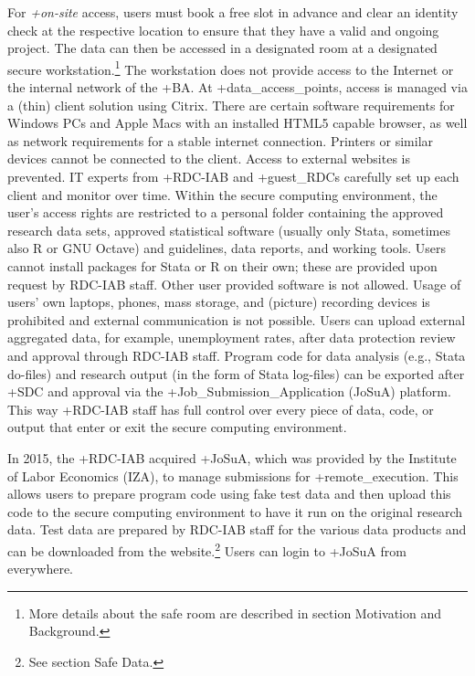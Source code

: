 \documentclass[
]{WileySix}
\begin{document}
For \emph{+on-site\textbar{}} access, users must book a free slot in advance and clear an identity check at the respective location to ensure that they have a valid and ongoing project. The data can then be accessed in a designated room at a designated secure workstation.\footnote{More details about the safe room are described in section Motivation and Background.} The workstation does not provide access to the Internet or the internal network of the +BA\textbar. At +data\_access\_points\textbar, access is managed via a (thin) client solution using Citrix. There are certain software requirements for Windows PCs and Apple Macs with an installed HTML5 capable browser, as well as network requirements for a stable internet connection. Printers or similar devices cannot be connected to the client. Access to external websites is prevented. IT experts from +RDC-IAB\textbar{} and +guest\_RDC\textbar s carefully set up each client and monitor over time. Within the secure computing environment, the user's access rights are restricted to a personal folder containing the approved research data sets, approved statistical software (usually only Stata, sometimes also R or GNU Octave) and guidelines, data reports, and working tools. Users cannot install packages for Stata or R on their own; these are provided upon request by RDC-IAB staff. Other user provided software is not allowed. Usage of users' own laptops, phones, mass storage, and (picture) recording devices is prohibited and external communication is not possible. Users can upload external aggregated data, for example, unemployment rates, after data protection review and approval through RDC-IAB staff. Program code for data analysis (e.g., Stata do-files) and research output (in the form of Stata log-files) can be exported after +SDC\textbar{} and approval via the +Job\_Submission\_Application\textbar{} (JoSuA) platform. This way +RDC-IAB\textbar{} staff has full control over every piece of data, code, or output that enter or exit the secure computing environment.

In 2015, the +RDC-IAB\textbar{} acquired +JoSuA\textbar, which was provided by the Institute of Labor Economics (IZA), to manage submissions for +remote\_execution\textbar. This allows users to prepare program code using fake test data and then upload this code to the secure computing environment to have it run on the original research data. Test data are prepared by RDC-IAB staff for the various data products and can be downloaded from the website.\footnote{See section Safe Data.} Users can login to +JoSuA\textbar{} from everywhere.
\end{document}
